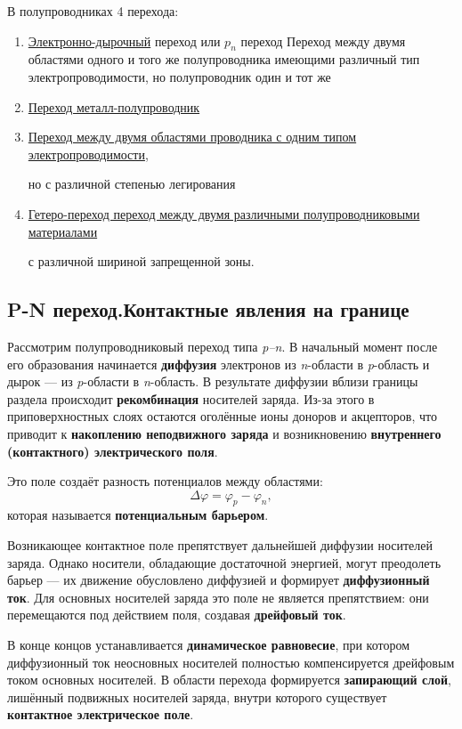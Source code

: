 \documentclass[../main.tex]{subfiles}
\begin{document}
В полупроводниках 4 перехода:

\begin{enumerate}
    \item \underline{Электронно-дырочный} переход или $p_n$ переход
    Переход между двумя областями одного и того же полупроводника имеющими различный тип электропроводимости, но полупроводник один и тот же
    \item \underline{Переход металл-полупроводник}
    \item \underline{Переход между двумя областями проводника с одним типом электропроводимости}, 
    
    но с различной степенью легирования
    \item \underline{Гетеро-переход переход между двумя различными полупроводниковыми материалами}
    
    с различной шириной запрещенной зоны.
\end{enumerate}

\subsection{P-N переход.Контактные явления на границе}


Рассмотрим полупроводниковый переход типа \textit{p–n}. 
В начальный момент после его образования начинается \textbf{диффузия} электронов из \textit{n}-области в \textit{p}-область и дырок — из \textit{p}-области в \textit{n}-область. 
В результате диффузии вблизи границы раздела происходит \textbf{рекомбинация} носителей заряда. 
Из-за этого в приповерхностных слоях остаются оголённые ионы доноров и акцепторов, что приводит к \textbf{накоплению неподвижного заряда} и возникновению \textbf{внутреннего (контактного) электрического поля}.

Это поле создаёт разность потенциалов между областями:
\[
\Delta \varphi = \varphi_p - \varphi_n,
\]
которая называется \textbf{потенциальным барьером}.

Возникающее контактное поле препятствует дальнейшей диффузии носителей заряда. 
Однако носители, обладающие достаточной энергией, могут преодолеть барьер — их движение обусловлено диффузией и формирует \textbf{диффузионный ток}. 
Для основных носителей заряда это поле не является препятствием: они перемещаются под действием поля, создавая \textbf{дрейфовый ток}.

В конце концов устанавливается \textbf{динамическое равновесие}, при котором диффузионный ток неосновных носителей полностью компенсируется дрейфовым током основных носителей. 
В области перехода формируется \textbf{запирающий слой}, лишённый подвижных носителей заряда, внутри которого существует \textbf{контактное электрическое поле}.
\end{document}
